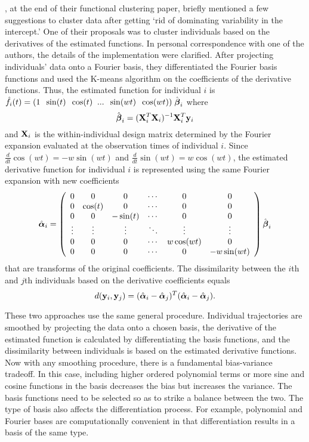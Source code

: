 \textcite{tarpey2003}, at the end of their functional clustering paper, briefly mentioned a few suggestions to cluster data after getting `rid of dominating variability in the intercept.' One of their proposals was to cluster individuals based on the derivatives of the estimated functions. In personal correspondence with one of the authors, the details of the implementation were clarified. After projecting individuals' data onto a Fourier basis, they differentiated the Fourier basis functions and used the K-means algorithm on the coefficients of the derivative functions. Thus, the estimated function for individual $i$ is $\hat{f}_{i}(t)= (1\;\; \sin(t)\;\;\cos(t)\;\;...\;\;\sin(wt)\;\;\cos(wt))\;\hat{\boldsymbol\beta}_{i}$ where
$$\hat{\boldsymbol\beta}_{i} = (\mathbf X^{T}_{i}\mathbf X_{i})^{-1}\mathbf X^{T}_{i}\mathbf y_{i}$$
and $\mathbf X_{i}$ is the within-individual design matrix determined by the Fourier expansion evaluated at the observation times of individual $i$. Since $\frac{d}{dt}\cos(wt) = -w\sin(wt)$ and $\frac{d}{dt}\sin(wt) = w\cos(wt)$, the estimated derivative function for individual $i$ is represented using the same Fourier expansion with new coefficients 
$$\hat{\boldsymbol\alpha}_{i} = \left(\begin{array}{cccccc}
0 & 0&0&\cdots&0&0\\
0&\cos(t)&0&\cdots&0&0\\
0&0&-\sin(t)&\cdots&0&0\\
\vdots&\vdots&\vdots&\ddots&\vdots&\vdots\\
0&0&0&\cdots&w\cos(wt)&0\\
0&0&0&\cdots&0&-w\sin(wt)\end{array}\right)\hat{\boldsymbol\beta}_{i}$$
that are transforms of the original coefficients. The dissimilarity between the $i$th and $j$th individuals based on the derivative coefficients equals
$$d(\mathbf y_{i},\mathbf y_{j}) = (\hat{\boldsymbol\alpha}_{i}-\hat{\boldsymbol\alpha}_{j})^{T}(\hat{\boldsymbol\alpha}_{i}-\hat{\boldsymbol\alpha}_{j}).$$

These two approaches use the same general procedure. Individual trajectories are smoothed by projecting the data onto a chosen basis, the derivative of the estimated function is calculated by differentiating the basis functions, and the dissimilarity between individuals is based on the estimated derivative functions. Now with any smoothing procedure, there is a fundamental bias-variance tradeoff. In this case, including higher ordered polynomial terms or more sine and cosine functions in the basis decreases the bias but increases the variance. The basis functions need to be selected so as to strike a balance between the two. The type of basis also affects the differentiation process. For example, polynomial and Fourier bases are computationally convenient in that differentiation results in a basis of the same type.

